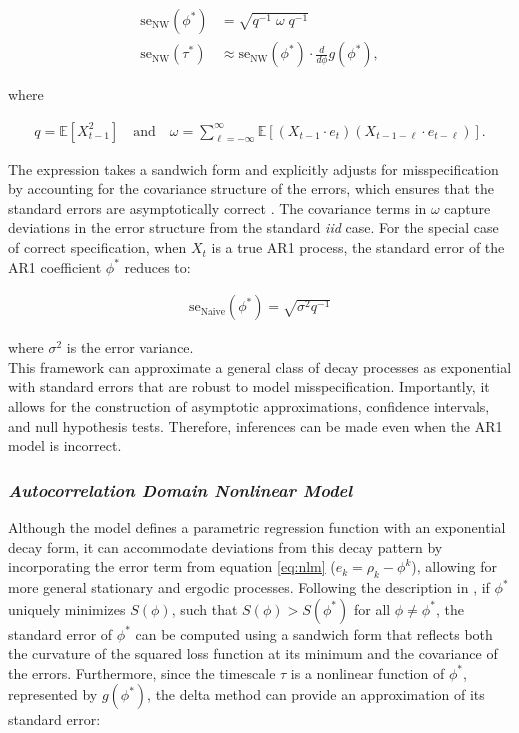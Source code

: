 \documentclass[main.tex]{subfiles}
\begin{document}
\begin{align}
    \text{se}_{\text{NW}}(\phi^*) &= \sqrt{q^{-1}\; \omega \; q^{-1}} \label{eq:se-ar1-phi}\\
    \text{se}_{\text{NW}}(\tau^*) &\approx \text{se}_{\text{NW}}(\phi^*) \cdot \frac{d}{d\phi} g(\phi^*),
\end{align}

\noindent where

\begin{align}
    q = \mathbb{E}[X_{t-1}^2] \quad\text{and}\quad \omega = \sum_{\ell=-\infty}^{\infty} \mathbb{E}[(X_{t-1} \cdot e_t)(X_{t-1-\ell} \cdot e_{t-\ell})].
\end{align}

The expression takes a sandwich form and explicitly adjusts for misspecification by accounting for the covariance structure of the errors, which ensures that the standard errors are asymptotically correct \citep[theorem 14.32]{hansen_econometrics_2022}. The covariance terms in $\omega$ capture deviations in the error structure from the standard \textit{iid} case. For the special case of correct specification, when $X_t$ is a true AR1 process, the standard error of the AR1 coefficient $\phi^*$ reduces to:

\begin{align}
    \text{se}_{\text{Naive}}(\phi^*) = \sqrt{\sigma^2 q^{-1}}
\end{align}

\noindent where $\sigma^2$ is the error variance. \\

This framework can approximate a general class of decay processes as exponential with standard errors that are robust to model misspecification. Importantly, it allows for the construction of asymptotic approximations, confidence intervals, and null hypothesis tests. Therefore, inferences can be made even when the AR1 model is incorrect.

\subsubsection{\normalfont\textit{Autocorrelation Domain Nonlinear Model}}

Although the model defines a parametric regression function with an exponential decay form, it can accommodate deviations from this decay pattern by incorporating the error term from equation \eqref{eq:nlm} ($e_k = \rho_k - \phi^k$), allowing for more general stationary and ergodic processes. Following the description in \citet[chapter~22.8 and chapter~23.5]{hansen_econometrics_2022}, if $\phi^*$ uniquely minimizes $S(\phi)$, such that $S(\phi) > S(\phi^*)$ for all $\phi \neq \phi^*$, the standard error of $\phi^*$ can be computed using a sandwich form that reflects both the curvature of the squared loss function at its minimum and the covariance of the errors. Furthermore, since the timescale $\tau$ is a nonlinear function of $\phi^*$, represented by $g(\phi^*)$, the delta method can provide an approximation of its standard error:
\end{document}
